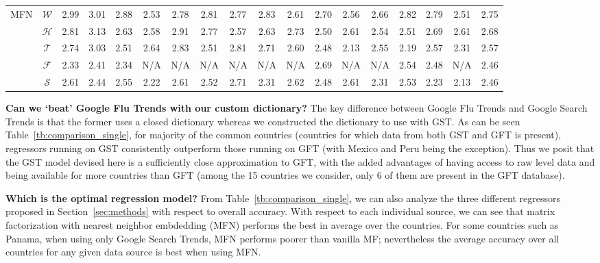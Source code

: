 \begin{table*}[H]
\begin{tabular}{|*{18}{c|}}
\hline
\multirow{5}{*}{MFN}& $\mathcal{W}$ &2.99&3.01&2.88&2.53&2.78&2.81&2.77&2.83&2.61&2.70&2.56&2.66&2.82&2.79&2.51&2.75\\ 
                    & $\mathcal{H}$ &2.81&3.13&2.63&2.58&2.91&2.77&2.57&2.63&2.73&2.50&2.61&2.54&2.51&2.69&2.61&2.68\\ 
                    & $\mathcal{T}$ &2.74&3.03&2.51&2.64&2.83&2.51&2.81&2.71&2.60&2.48&2.13&2.55&2.19&2.57&2.31&2.57\\ 
                    & $\mathcal{F}$ &2.33&2.41&2.34& N/A& N/A& N/A& N/A& N/A& N/A&2.69& N/A& N/A&2.54&2.48& N/A&2.46\\ 
                    & $\mathcal{S}$ &2.61&2.44&2.55&2.22&2.61&2.52&2.71&2.31&2.62&2.48&2.61&2.31&2.53&2.23&2.13&2.46\\ 
\hline
\end{tabular}
\end{table*}


{\noindent \textbf{Can we `beat' Google Flu Trends with our custom dictionary?}}  
The key difference between Google Flu Trends and Google Search Trends is that the former uses a closed dictionary whereas
we constructed the dictionary to use with GST.
As can be seen Table~\ref{tb:comparison_single},
for majority of the common countries (countries for which data from both GST and GFT
is present), regressors running on GST consistently 
outperform those running on GFT (with Mexico and Peru being the exception).
Thus we posit that the GST model devised here is a sufficiently close approximation to GFT, 
with the added advantages of having access to raw level data and being available for more countries 
than GFT (among the 15 countries we consider, only 6 of them are present in the GFT database).

{\noindent \textbf{Which is the optimal regression model?}} From Table~\ref{tb:comparison_single}, we can also
analyze the three different regressors proposed in Section~\ref{sec:methods} with respect to overall accuracy.
With respect to each individual source, we can see that matrix factorization with nearest 
neighbor embdedding (MFN) performs the best in average over the countries.
For some countries such as Panama, when using only Google Search Trends, MFN
performs poorer than vanilla MF; nevertheless the average accuracy over all countries for any given
data source is best when using MFN.


